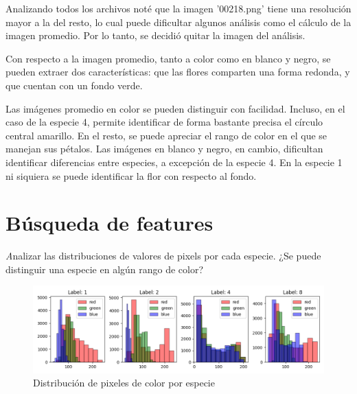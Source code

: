 \documentclass{article}
\begin{document}
Analizando todos los archivos noté que la imagen '00218.png' tiene una resolución mayor a la del resto, lo cual puede dificultar algunos análisis como el cálculo de la imagen promedio. Por lo tanto, se decidió quitar la imagen del análisis.

Con respecto a la imagen promedio, tanto a color como en blanco y negro, se pueden extraer dos características: que las flores comparten una forma redonda, y que cuentan con un fondo verde.

Las imágenes promedio en color se pueden distinguir con facilidad. Incluso, en el caso de la especie 4, permite identificar de forma bastante precisa el círculo central amarillo. En el resto, se puede apreciar el rango de color en el que se manejan sus pétalos. Las imágenes en blanco y negro, en cambio, dificultan identificar diferencias
entre especies, a excepción de la especie 4. En la especie 1 ni siquiera se puede identificar la flor con respecto al fondo.

\section{Búsqueda de features}

{\emph Analizar las distribuciones de valores de pixels por cada especie. ¿Se puede distinguir
una especie en algún rango de color?}


\begin{figure}[h!]
  \centering    
  \includegraphics[width=1\textwidth]{8_3_pixeles_especies_color_muestra.png}
  \caption{Distribución de pixeles de color por especie}
\end{figure}
\end{document}
